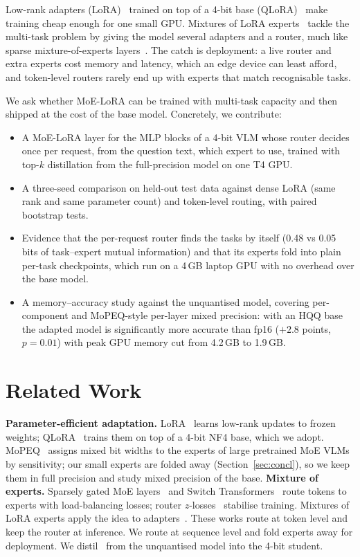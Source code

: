 \documentclass[conference]{IEEEtran}
\begin{document}
Low-rank adapters (LoRA)~\cite{hu2022lora} trained on top of a 4-bit base
(QLoRA)~\cite{dettmers2023qlora} make training cheap enough for one small GPU. Mixtures of LoRA
experts~\cite{zadouri2023molora,dou2023loramoe} tackle the multi-task problem by giving the model several
adapters and a router, much like sparse mixture-of-experts layers~\cite{shazeer2017moe,fedus2022switch}.
The catch is deployment: a live router and extra experts cost memory and latency, which an edge device
can least afford, and token-level routers rarely end up with experts that match recognisable tasks.

We ask whether MoE-LoRA can be trained with multi-task capacity and then shipped at the cost of the base
model. Concretely, we contribute:
\begin{itemize}
\item A MoE-LoRA layer for the MLP blocks of a 4-bit VLM whose router decides once per request, from the
question text, which expert to use, trained with top-$k$ distillation from the full-precision model on
one T4 GPU.
\item A three-seed comparison on held-out test data against dense LoRA (same rank and same parameter
count) and token-level routing, with paired bootstrap tests.
\item Evidence that the per-request router finds the tasks by itself (0.48 vs 0.05 bits of task--expert
mutual information) and that its experts fold into plain per-task checkpoints, which run on a 4\,GB
laptop GPU with no overhead over the base model.
\item A memory--accuracy study against the unquantised model, covering per-component and MoPEQ-style
per-layer mixed precision: with an HQQ base the adapted model is significantly more accurate than fp16
($+2.8$ points, $p=0.01$) with peak GPU memory cut from 4.2\,GB to 1.9\,GB.
\end{itemize}

\section{Related Work}
\textbf{Parameter-efficient adaptation.} LoRA~\cite{hu2022lora} learns low-rank updates to frozen
weights; QLoRA~\cite{dettmers2023qlora} trains them on top of a 4-bit NF4 base, which we adopt. MoPEQ~\cite{chitty2025mopeq}
assigns mixed bit widths to the experts of large pretrained MoE VLMs by sensitivity; our small experts
are folded away (Section~\ref{sec:concl}), so we keep them in full precision and study mixed precision of the base.
\textbf{Mixture of experts.} Sparsely gated MoE layers~\cite{shazeer2017moe} and Switch
Transformers~\cite{fedus2022switch} route tokens to experts with load-balancing losses; router
$z$-losses~\cite{zoph2022stmoe} stabilise training. Mixtures of LoRA experts apply the idea to
adapters~\cite{zadouri2023molora,dou2023loramoe}. These works route at token level and keep the router
at inference. We route at sequence level and fold experts away for deployment. We distil~\cite{hinton2015distilling} from the unquantised model into the 4-bit student.
\end{document}
